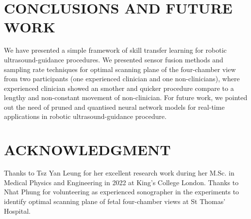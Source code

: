 \documentclass[a4paper, 10pt, conference]{ieeeconf}      %
\begin{document}
\section{CONCLUSIONS AND FUTURE WORK}
We have presented a simple framework of skill transfer learning for robotic ultrasound-guidance procedures.
We presented sensor fusion methods and sampling rate techniques for optimal scanning plane of the four-chamber view from two participants (one experienced clinician and one non-clinicians), where experienced clinician showed an smother and quicker procedure compare to a lengthy and non-constant movement of non-clinician.
For future work, we pointed out the need of pruned and quantised neural network models for real-time applications in robotic ultrasound-guidance procedure. 


\addtolength{\textheight}{-12cm}   %


\section*{ACKNOWLEDGMENT}
Thanks to Tsz Yan Leung for her excellent research work  during her M.Sc. in Medical Physics and Engineering in 2022 at King's College London.
Thanks to Nhat Phung for volunteering as experienced sonographer in the experiments to identify optimal scanning plane of fetal four-chamber views at St Thomas' Hospital. 


\end{document}

